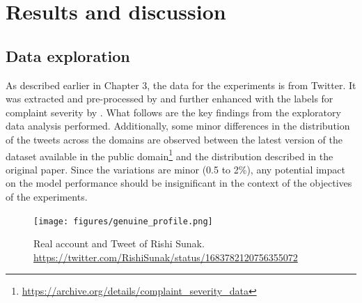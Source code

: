 \chapter{Results and discussion}

\section{Data exploration}
As described earlier in Chapter 3, the data for the experiments is from Twitter. It was extracted and pre-processed by \cite{preotiuc-pietro_automatically_2019} and further enhanced with the labels for complaint severity by \cite{jinModelingSeverityComplaints2021}. What follows are the key findings from the exploratory data analysis performed. Additionally, some minor differences in the distribution of the tweets across the domains are observed between the latest version of the dataset available in the public domain\footnote{\url{https://archive.org/details/complaint_severity_data}} and the distribution described in the original paper. Since the variations are minor (0.5 to 2\%), any potential impact on the model performance should be insignificant in the context of the objectives of the experiments.


\begin{figure}[htb]
    \centering
    \texttt{[image: figures/genuine\_profile.png]}
        \vspace*{-3mm}
        \caption{Real account and Tweet of Rishi Sunak. \url{https://twitter.com/RishiSunak/status/1683782120756355072}}
    \end{figure}

